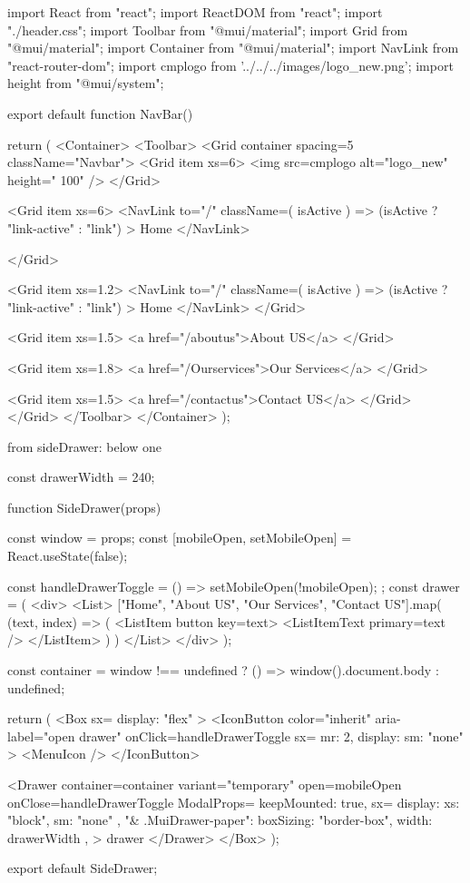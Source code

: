 import React from "react";
import { ReactDOM } from "react";
import "./header.css";
import { Toolbar } from "@mui/material";
import { Grid } from "@mui/material";
import { Container } from "@mui/material";
import { NavLink } from "react-router-dom";
import cmplogo from '../../../images/logo_new.png';
import { height } from "@mui/system";

export default function NavBar() {
  return (
    <Container>
      <Toolbar>
        <Grid container spacing={5} className="Navbar">
          <Grid item xs={6}>
            <img src={cmplogo}  alt="logo_new" height=" 100"   />
          </Grid>

          <Grid item xs={6}>
          <NavLink
              to="/"
              className={({ isActive }) => (isActive ? "link-active" : "link")}
            >
              Home
            </NavLink>

          </Grid>

          <Grid item xs={1.2}>
          <NavLink
              to="/"
              className={({ isActive }) => (isActive ? "link-active" : "link")}
            >
              Home
            </NavLink>
          </Grid>

          <Grid item xs={1.5}>
            <a href="/aboutus">About US</a>
          </Grid>

          <Grid item xs={1.8}>
            <a href="/Ourservices">Our Services</a>
          </Grid>

          <Grid item xs={1.5}>
            <a href="/contactus">Contact US</a>
          </Grid>
        </Grid>
      </Toolbar>
    </Container>
  );
}

from sideDrawer: below one

const drawerWidth = 240;

function SideDrawer(props) {
  const { window } = props;
  const [mobileOpen, setMobileOpen] = React.useState(false);

  const handleDrawerToggle = () => {
    setMobileOpen(!mobileOpen);
  };
  const drawer = (
    <div>
      <List>
        {["Home", "About US", "Our Services", "Contact US"].map(
          (text, index) => (
            <ListItem button key={text}>
              <ListItemText primary={text} />
            </ListItem>
          )
        )}
      </List>
    </div>
  );

  const container =
    window !== undefined ? () => window().document.body : undefined;

  return (
    <Box sx={{ display: "flex" }}>
      <IconButton
        color="inherit"
        aria-label="open drawer"
        onClick={handleDrawerToggle}
        sx={{ mr: 2, display: { sm: "none" } }}
      >
        <MenuIcon />
      </IconButton>

      <Drawer
        container={container}
        variant="temporary"
        open={mobileOpen}
        onClose={handleDrawerToggle}
        ModalProps={{
          keepMounted: true,
        }}
        sx={{
          display: { xs: "block", sm: "none" },
          "& .MuiDrawer-paper": { boxSizing: "border-box", width: drawerWidth },
        }}
      >
        {drawer}
      </Drawer>
    </Box>
  );
}
export default SideDrawer;
